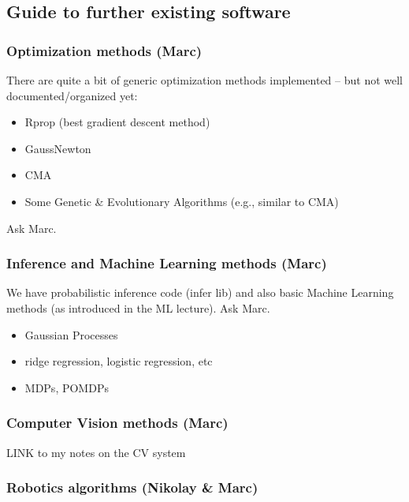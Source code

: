 \subsection{Guide to further existing software}

\subsubsection{Optimization methods (Marc)}

There are quite a bit of generic optimization methods implemented --
but not well documented/organized yet:

\begin{itemize}
\item Rprop (best gradient descent method)

\item GaussNewton

\item CMA

\item Some Genetic \& Evolutionary Algorithms (e.g., similar to CMA)
\end{itemize}

Ask Marc.



\subsubsection{Inference and Machine Learning methods (Marc)}

We have probabilistic inference code (infer lib) and also basic
Machine Learning methods (as introduced in the ML lecture). Ask Marc.

\begin{itemize}
\item Gaussian Processes

\item ridge regression, logistic regression, etc

\item MDPs, POMDPs
\end{itemize}



\subsubsection{Computer Vision methods (Marc)}

LINK to my notes on the CV system


\subsubsection{Robotics algorithms (Nikolay \& Marc)}

